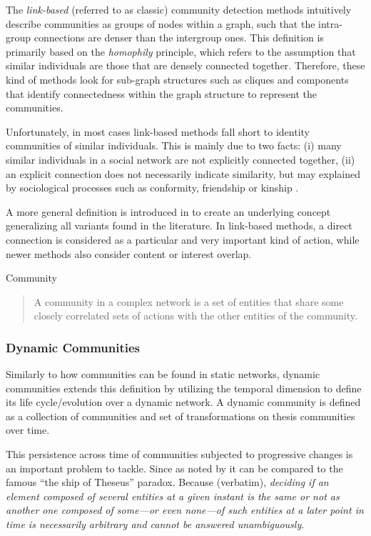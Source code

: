 \documentclass[
acmsmall,
nonacm,
screen,
acmthm]{../../scripts/pandoc/templates/acmart}
\begin{document}
The \emph{link-based} (referred to as classic) community detection
methods intuitively describe communities as groups of nodes within a
graph, such that the intra-group connections are denser than the
intergroup ones. This definition is primarily based on the
\emph{homophily} principle, which refers to the assumption that similar
individuals are those that are densely connected together. Therefore,
these kind of methods look for sub-graph structures such as cliques and
components that identify connectedness within the graph structure to
represent the communities.

Unfortunately, in most cases link-based methods fall short to identity
communities of similar individuals. This is mainly due to two facts: (i)
many similar individuals in a social network are not explicitly
connected together, (ii) an explicit connection does not necessarily
indicate similarity, but may explained by sociological processes such as
conformity, friendship or kinship
\citep{diehlRelationshipIdentificationSocial2007, faniUserCommunityDetection2020}.

A more general definition is introduced in
\citep{cosciaClassificationCommunityDiscovery2011} to create an
underlying concept generalizing all variants found in the literature. In
link-based methods, a direct connection is considered as a particular
and very important kind of action, while newer methods also consider
content or interest overlap.

\protect\hypertarget{thm:id}{}{Community}

\begin{quote}
A community in a complex network is a set of entities that share some
closely correlated sets of actions with the other entities of the
community.
\end{quote}

\hypertarget{dynamic-communities}{%
\subsubsection{Dynamic Communities}\label{dynamic-communities}}

Similarly to how communities can be found in static networks, dynamic
communities extends this definition by utilizing the temporal dimension
to define its life cycle/evolution over a dynamic network. A dynamic
community is defined as a collection of communities and set of
transformations on thesis communities over time.

This persistence across time of communities subjected to progressive
changes is an important problem to tackle. Since as noted by
\citep{rossettiCommunityDiscoveryDynamic2018} it can be compared to the
famous ``the ship of Theseus'' paradox. Because (verbatim),
\emph{deciding if an element composed of several entities at a given
instant is the same or not as another one composed of some---or even
none---of such entities at a later point in time is necessarily
arbitrary and cannot be answered unambiguously}.
\end{document}
